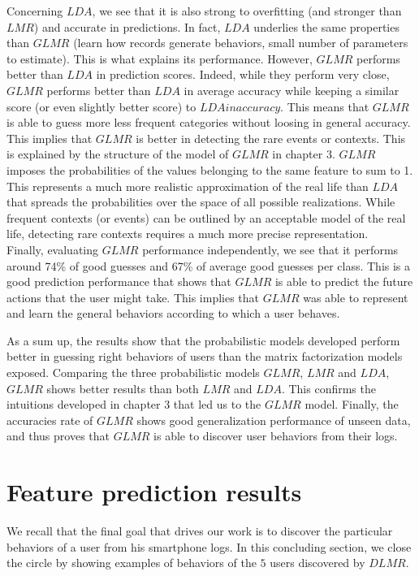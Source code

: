 Concerning $LDA$, we see that it is also strong to overfitting (and stronger than $LMR$) and accurate in predictions. In fact, $LDA$ underlies the same properties than $GLMR$ (learn how records generate behaviors, small number of parameters to estimate). This is what explains its performance. However, $GLMR$ performs better than $LDA$ in prediction scores. Indeed, while they perform very close, $GLMR$ performs better than $LDA$ in average accuracy while keeping a similar score (or even slightly better score) to $LDA in accuracy$. This means that $GLMR$ is able to guess more less frequent categories without loosing in general accuracy. This implies that $GLMR$ is better in detecting the rare events or contexts. This is explained by the structure of the model of $GLMR$ in chapter 3. $GLMR$ imposes the probabilities of the values belonging to the same feature to sum to 1. This represents a much more realistic approximation of the real life than $LDA$ that spreads the probabilities over the space of all possible realizations. While frequent contexts (or events) can be outlined by an acceptable model of the real life, detecting rare contexts requires a much more precise representation.
\\Finally, evaluating $GLMR$ performance independently, we see that it performs around 74\% of good guesses and 67\% of average good guesses per class. This is a good prediction performance that shows that $GLMR$ is able to predict the future actions that the user might take. This implies that $GLMR$ was able to represent and learn the general behaviors according to which a user behaves.

As a sum up, the results show that the probabilistic models developed perform better in guessing right behaviors of users than the matrix factorization models exposed. Comparing the three probabilistic models $GLMR$, $LMR$ and $LDA$, $GLMR$ shows better results than both $LMR$ and $LDA$. This confirms the intuitions developed in chapter 3 that led us to the $GLMR$ model. Finally, the accuracies rate of $GLMR$ shows good generalization performance of unseen data, and thus proves that $GLMR$ is able to discover user behaviors from their logs.



\section{Feature prediction results}
We recall that the final goal that drives our work is to discover the particular behaviors of a user from his smartphone logs. In this concluding section, we close the circle by showing examples of behaviors of the $5$ users discovered by $DLMR$. \par

